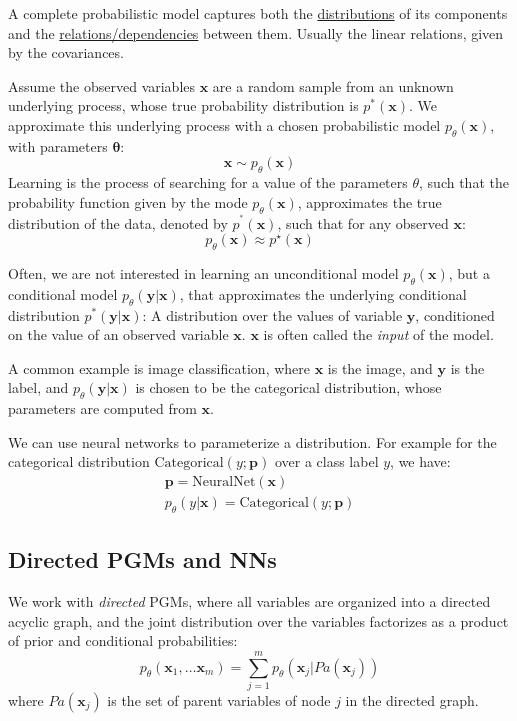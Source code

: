 \documentclass{article}
\begin{document}
\begin{remark} A complete probabilistic model captures both the \ul{distributions} of its components and the \ul{relations/dependencies} between them. Usually the linear relations, given by the covariances.
\end{remark}

\begin{definition} Assume the observed variables $\bm{x}$ are a random sample from an unknown underlying process, whose true probability distribution is $p^{\ast}(\bm{x})$. We approximate this underlying process with a chosen probabilistic model $p_{\theta}(\bm{x})$, with parameters $\bm{\theta}$:
\[
  \bm{x} \sim p_{\theta}(\bm{x}) 
\]
  Learning is the process of searching for a value of the parameters $\theta$, such that the probability function given by the mode $p_{\theta}(\bm{x})$, approximates the true distribution of the data, denoted by $p^{^{\ast}}(\bm{x})$, such that for any observed $\bm{x}$:
\[
  p_{\theta}(\bm{x}) \approx p ^{\star}(\bm{x}) 
\]
\end{definition}

\begin{definition} Often, we are not interested in learning an unconditional model $p_{\theta}(\bm{x})$, but a conditional model $p_{\theta}(\bm{y} | \bm{x})$, that approximates the underlying conditional distribution $p ^{\ast}(\bm{y} | \bm{x})$: A distribution over the values of variable $\bm{y}$, conditioned on the value of an observed variable $\bm{x}$. $\bm{x}$ is often called the \textit{input} of the model. 

A common example is image classification, where $\bm{x}$ is the image, and $\bm{y}$ is the label, and $p_{\theta}(\bm{y}|\bm{x})$ is chosen to be the categorical distribution, whose parameters are computed from $\bm{x}$. 
\end{definition}

\begin{remark} We can use neural networks to parameterize a distribution. For example for the categorical distribution $\mathrm{Categorical}(y ; \bm{p})$ over a class label $y$, we have: 
\begin{gather*}
  \bm{p} = \mathrm{NeuralNet}(\bm{x}) \\
  p_{\theta}(y | \bm{x}) = \mathrm{Categorical}(y ; \bm{p})
\end{gather*}
\end{remark}

\subsection{Directed PGMs and NNs}
We work with \textit{directed} PGMs, where all variables are organized into a directed acyclic graph, and the joint distribution over the variables factorizes as a product of prior and conditional probabilities:
\[
  p_{\theta}(\bm{x}_1, \ldots  \bm{x}_m) = \sum_{j=1}^{m} p_{\theta}(\bm{x}_j | Pa(\bm{x}_j))    
\]
where $Pa(\bm{x}_j)$ is the set of parent variables of node $j$ in the directed graph. 
\end{document}
